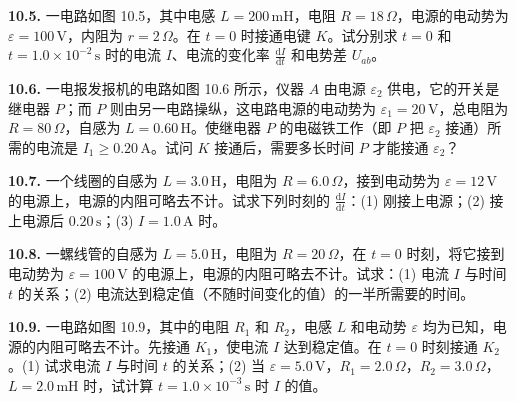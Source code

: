 \vfill
\newpage

\textbf{10.5.} 一电路如图 10.5，其中电感 $L = 200\,\mathrm{mH}$，电阻 $R = 18\,\Omega$，电源的电动势为 $\varepsilon = 100\,\mathrm{V}$，内阻为 $r = 2\,\Omega$。在 $t = 0$ 时接通电键 $K$。试分别求 $t = 0$ 和 $t = 1.0 \times 10^{-2}\,\mathrm{s}$ 时的电流 $I$、电流的变化率 $\displaystyle \frac{\mathrm{d}I}{\mathrm{d}t}$ 和电势差 $U_{ab}$。

\begin{center}
\end{center}

\vfill
\newpage

\textbf{10.6.} 一电报发报机的电路如图 10.6 所示，仪器 $A$ 由电源 $\varepsilon_2$ 供电，它的开关是继电器 $P$；而 $P$ 则由另一电路操纵，这电路电源的电动势为 $\varepsilon_1 = 20\,\mathrm{V}$，总电阻为 $R = 80\,\Omega$，自感为 $L = 0.60\,\mathrm{H}$。使继电器 $P$ 的电磁铁工作（即 $P$ 把 $\varepsilon_2$ 接通）所需的电流是 $I_1 \geqslant 0.20\,\mathrm{A}$。试问 $K$ 接通后，需要多长时间 $P$ 才能接通 $\varepsilon_2$？

\begin{center}
\end{center}

\vfill
\newpage

\textbf{10.7.} 一个线圈的自感为 $L = 3.0\,\mathrm{H}$，电阻为 $R = 6.0\,\Omega$，接到电动势为 $\varepsilon = 12\,\mathrm{V}$ 的电源上，电源的内阻可略去不计。试求下列时刻的 $\displaystyle \frac{\mathrm{d}I}{\mathrm{d}t}$：(1) 刚接上电源；(2) 接上电源后 $0.20\,\mathrm{s}$；(3) $I = 1.0\,\mathrm{A}$ 时。

\vfill
\newpage

\textbf{10.8.} 一螺线管的自感为 $L = 5.0\,\mathrm{H}$，电阻为 $R = 20\,\Omega$，在 $t = 0$ 时刻，将它接到电动势为 $\varepsilon = 100\,\mathrm{V}$ 的电源上，电源的内阻可略去不计。试求：(1) 电流 $I$ 与时间 $t$ 的关系；(2) 电流达到稳定值（不随时间变化的值）的一半所需要的时间。

\vfill
\newpage

\textbf{10.9.} 一电路如图 10.9，其中的电阻 $R_1$ 和 $R_2$，电感 $L$ 和电动势 $\varepsilon$ 均为已知，电源的内阻可略去不计。先接通 $K_1$，使电流 $I$ 达到稳定值。在 $t = 0$ 时刻接通 $K_2$。(1) 试求电流 $I$ 与时间 $t$ 的关系；(2) 当 $\varepsilon = 5.0\,\mathrm{V}$，$R_1 = 2.0\,\Omega$，$R_2 = 3.0\,\Omega$，$L = 2.0\,\mathrm{mH}$ 时，试计算 $t = 1.0 \times 10^{-3}\,\mathrm{s}$ 时 $I$ 的值。

